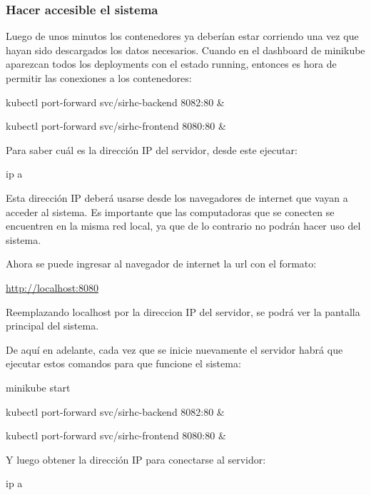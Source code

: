 \documentclass[twoside]{article}
\begin{document}
\subsubsection{Hacer accesible el sistema}
Luego de unos minutos los contenedores ya deberían estar corriendo una vez que hayan sido descargados los datos necesarios. Cuando en el dashboard de minikube aparezcan todos los deployments con el estado running, entonces es hora de permitir las conexiones a los contenedores:

kubectl port-forward svc/sirhc-backend 8082:80 \&

kubectl port-forward svc/sirhc-frontend 8080:80 \&

Para saber cuál es la dirección IP del servidor, desde este ejecutar:

ip a

Esta dirección IP deberá usarse desde los navegadores de internet que vayan a acceder al sistema. Es importante que las computadoras que se conecten se encuentren en la misma red local, ya que de lo contrario no podrán hacer uso del sistema.

Ahora se puede ingresar al navegador de internet la url con el formato:

\href{http://localhost:8080}{http://localhost:8080}

Reemplazando localhost por la direccion IP del servidor, se podrá ver la pantalla principal del sistema.

De aquí en adelante, cada vez que se inicie nuevamente el servidor habrá que ejecutar estos comandos para que funcione el sistema:

minikube start

kubectl port-forward svc/sirhc-backend 8082:80 \&

kubectl port-forward svc/sirhc-frontend 8080:80 \&

Y luego obtener la dirección IP para conectarse al servidor:

ip a
\end{document}
